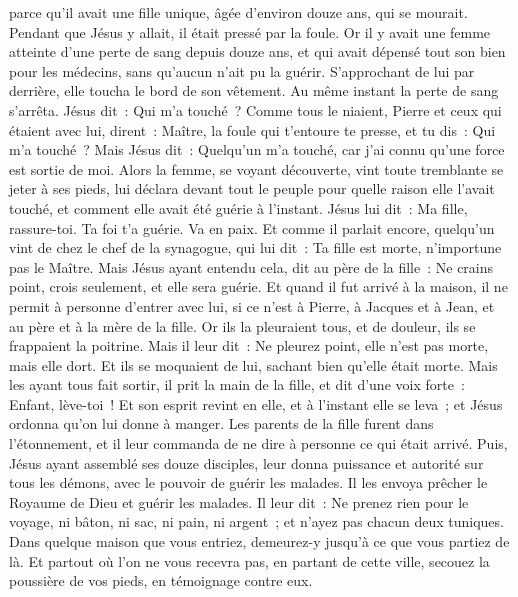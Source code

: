 \begin{multicols}{2}
parce qu'il avait une fille unique, âgée d'environ douze ans, qui se mourait. Pendant que Jésus y allait, il était pressé par la foule.
Or il y avait une femme atteinte d'une perte de sang depuis douze ans, et qui avait dépensé tout son bien pour les médecins, sans qu'aucun n'ait pu la guérir.
S'approchant de lui par derrière, elle toucha le bord de son vêtement. Au même instant la perte de sang s'arrêta.
Jésus dit~: Qui m'a touché~? Comme tous le niaient, Pierre et ceux qui étaient avec lui, dirent~: Maître, la foule qui t'entoure te presse, et tu dis~: Qui m'a touché~?
Mais Jésus dit~: Quelqu'un m'a touché, car j'ai connu qu'une force est sortie de moi.
Alors la femme, se voyant découverte, vint toute tremblante se jeter à ses pieds, lui déclara devant tout le peuple pour quelle raison elle l'avait touché, et comment elle avait été guérie à l'instant.
Jésus lui dit~: Ma fille, rassure-toi. Ta foi t'a guérie. Va en paix.
Et comme il parlait encore, quelqu'un vint de chez le chef de la synagogue, qui lui dit~: Ta fille est morte, n'importune pas le Maître.
Mais Jésus ayant entendu cela, dit au père de la fille~: Ne crains point, crois seulement, et elle sera guérie.
Et quand il fut arrivé à la maison, il ne permit à personne d'entrer avec lui, si ce n'est à Pierre, à Jacques et à Jean, et au père et à la mère de la fille.
Or ils la pleuraient tous, et de douleur, ils se frappaient la poitrine. Mais il leur dit~: Ne pleurez point, elle n'est pas morte, mais elle dort.
Et ils se moquaient de lui, sachant bien qu'elle était morte.
Mais les ayant tous fait sortir, il prit la main de la fille, et dit d'une voix forte~: Enfant, lève-toi~!
Et son esprit revint en elle, et à l'instant elle se leva~; et Jésus ordonna qu'on lui donne à manger.
Les parents de la fille furent dans l'étonnement, et il leur commanda de ne dire à personne ce qui était arrivé.
\VerseOne{}Puis, Jésus ayant assemblé ses douze disciples, leur donna puissance et autorité sur tous les démons, avec le pouvoir de guérir les malades.
Il les envoya prêcher le Royaume de Dieu et guérir les malades.
Il leur dit~: Ne prenez rien pour le voyage, ni bâton, ni sac, ni pain, ni argent~; et n'ayez pas chacun deux tuniques.
Dans quelque maison que vous entriez, demeurez-y jusqu'à ce que vous partiez de là.
Et partout où l'on ne vous recevra pas, en partant de cette ville, secouez la poussière de vos pieds, en témoignage contre eux.

\end{multicols}
